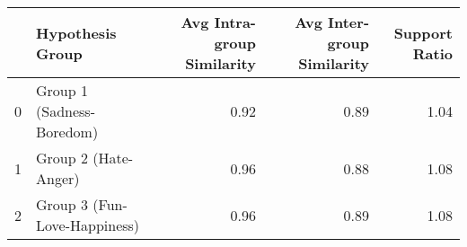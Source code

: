 \begin{tabular}{llrrr}
\toprule
 & Hypothesis Group & Avg Intra-group Similarity & Avg Inter-group Similarity & Support Ratio \\
\midrule
0 & Group 1 (Sadness-Boredom) & 0.92 & 0.89 & 1.04 \\
1 & Group 2 (Hate-Anger) & 0.96 & 0.88 & 1.08 \\
2 & Group 3 (Fun-Love-Happiness) & 0.96 & 0.89 & 1.08 \\
\bottomrule
\end{tabular}
